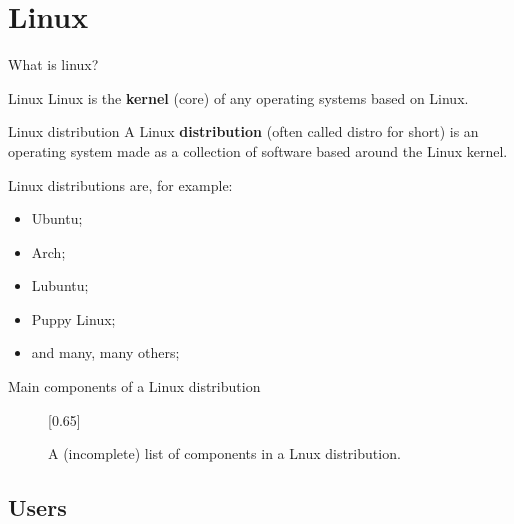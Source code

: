 \section{Linux}

\begin{frame}{What is linux?}
	\begin{definition}{Linux}
		Linux is the \textbf{kernel} (core) of any operating systems based on Linux.
	\end{definition}
	
	\begin{definition}{Linux distribution}
		A Linux \textbf{distribution} (often called distro for short) is an operating system made as a collection of software based around the Linux kernel.\cite{linux:whatis}
	\end{definition}
	
	Linux distributions are, for example:
	\begin{itemize}
		\item Ubuntu;
		\item Arch;
		\item Lubuntu;
		\item Puppy Linux;
		\item and many, many others;
	\end{itemize}
	
\end{frame}

\begin{frame}{Main components of a Linux distribution}

\begin{figure}
	\centering
	[0.65]
	\caption{A (incomplete) list of components in a Lnux distribution.\cite{linux:components:sabbagh, linux:components:wiki}}
\end{figure}
	
\end{frame}

\subsection{Users}

